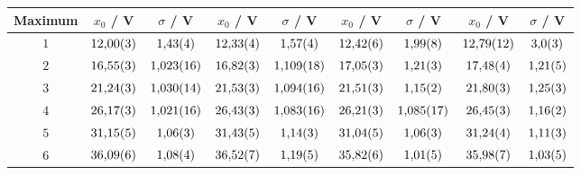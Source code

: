 \begin{table}[htbp]
\begin{tabular}{c|cc|cc|cc|cc}
\hline
Maximum & $x_0$ / \unit{\volt} & $\sigma$ / \unit{\volt} & $x_0$ / \unit{\volt} & $\sigma$ / \unit{\volt} & $x_0$ / \unit{\volt} & $\sigma$ / \unit{\volt} & $x_0$ / \unit{\volt} & $\sigma$ / \unit{\volt} \\ 
\hline
$\num{1}$ & $\num{12.00\pm 0.03}$ & $\num{1.43\pm 0.04}$ & $\num{12.33\pm 0.04}$ & $\num{1.57\pm 0.04}$ & $\num{12.42\pm 0.06}$ & $\num{1.99\pm 0.08}$ & $\num{12.79\pm 0.12}$ & $\num{3.0\pm 0.3}$ \\
$\num{2}$ & $\num{16.55\pm 0.03}$ & $\num{1.023\pm 0.016}$ & $\num{16.82\pm 0.03}$ & $\num{1.109\pm 0.018}$ & $\num{17.05\pm 0.03}$ & $\num{1.21\pm 0.03}$ & $\num{17.48\pm 0.04}$ & $\num{1.21\pm 0.05}$ \\
$\num{3}$ & $\num{21.24\pm 0.03}$ & $\num{1.030\pm 0.014}$ & $\num{21.53\pm 0.03}$ & $\num{1.094\pm 0.016}$ & $\num{21.51\pm 0.03}$ & $\num{1.15\pm 0.02}$ & $\num{21.80\pm 0.03}$ & $\num{1.25\pm 0.03}$ \\
$\num{4}$ & $\num{26.17\pm 0.03}$ & $\num{1.021\pm 0.016}$ & $\num{26.43\pm 0.03}$ & $\num{1.083\pm 0.016}$ & $\num{26.21\pm 0.03}$ & $\num{1.085\pm 0.017}$ & $\num{26.45\pm 0.03}$ & $\num{1.16\pm 0.02}$ \\
$\num{5}$ & $\num{31.15\pm 0.05}$ & $\num{1.06\pm 0.03}$ & $\num{31.43\pm 0.05}$ & $\num{1.14\pm 0.03}$ & $\num{31.04\pm 0.05}$ & $\num{1.06\pm 0.03}$ & $\num{31.24\pm 0.04}$ & $\num{1.11\pm 0.03}$ \\
$\num{6}$ & $\num{36.09\pm 0.06}$ & $\num{1.08\pm 0.04}$ & $\num{36.52\pm 0.07}$ & $\num{1.19\pm 0.05}$ & $\num{35.82\pm 0.06}$ & $\num{1.01\pm 0.05}$ & $\num{35.98\pm 0.07}$ & $\num{1.03\pm 0.05}$ \\
\hline\end{tabular}
\label{tab:temperatur}
\end{table}